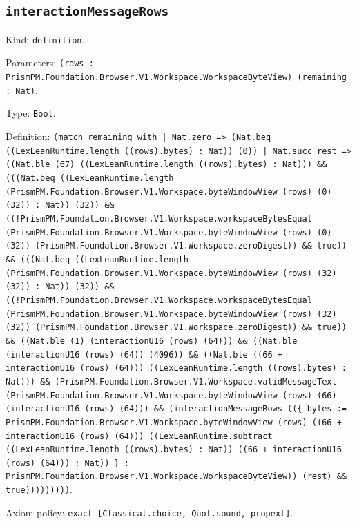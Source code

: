 \documentclass[11pt]{article}
\begin{document}
\subsection*{\texttt{interactionMessageRows}}
\noindent Kind: \texttt{definition}.\par
\noindent Parameters: \texttt{(rows : PrismPM.Foundation.Browser.V1.Workspace.WorkspaceByteView) (remaining : Nat)}.\par
\noindent Type: \texttt{Bool}.\par
\noindent Definition: \texttt{(match remaining with | Nat.zero => (Nat.beq ((LexLeanRuntime.length ((rows).bytes) : Nat)) (0)) | Nat.succ rest => ((Nat.ble (67) ((LexLeanRuntime.length ((rows).bytes) : Nat))) \&\& (((Nat.beq ((LexLeanRuntime.length (PrismPM.Foundation.Browser.V1.Workspace.byteWindowView (rows) (0) (32)) : Nat)) (32)) \&\& ((!PrismPM.Foundation.Browser.V1.Workspace.workspaceBytesEqual (PrismPM.Foundation.Browser.V1.Workspace.byteWindowView (rows) (0) (32)) (PrismPM.Foundation.Browser.V1.Workspace.zeroDigest)) \&\& true)) \&\& (((Nat.beq ((LexLeanRuntime.length (PrismPM.Foundation.Browser.V1.Workspace.byteWindowView (rows) (32) (32)) : Nat)) (32)) \&\& ((!PrismPM.Foundation.Browser.V1.Workspace.workspaceBytesEqual (PrismPM.Foundation.Browser.V1.Workspace.byteWindowView (rows) (32) (32)) (PrismPM.Foundation.Browser.V1.Workspace.zeroDigest)) \&\& true)) \&\& ((Nat.ble (1) (interactionU16 (rows) (64))) \&\& ((Nat.ble (interactionU16 (rows) (64)) (4096)) \&\& ((Nat.ble ((66 + interactionU16 (rows) (64))) ((LexLeanRuntime.length ((rows).bytes) : Nat))) \&\& (PrismPM.Foundation.Browser.V1.Workspace.validMessageText (PrismPM.Foundation.Browser.V1.Workspace.byteWindowView (rows) (66) (interactionU16 (rows) (64))) \&\& (interactionMessageRows ((\{ bytes := PrismPM.Foundation.Browser.V1.Workspace.byteWindowView (rows) ((66 + interactionU16 (rows) (64))) ((LexLeanRuntime.subtract ((LexLeanRuntime.length ((rows).bytes) : Nat)) ((66 + interactionU16 (rows) (64))) : Nat)) \} : PrismPM.Foundation.Browser.V1.Workspace.WorkspaceByteView)) (rest) \&\& true)))))))))}.\par
\noindent Axiom policy: \texttt{exact [Classical.choice, Quot.sound, propext]}.\par
\end{document}

